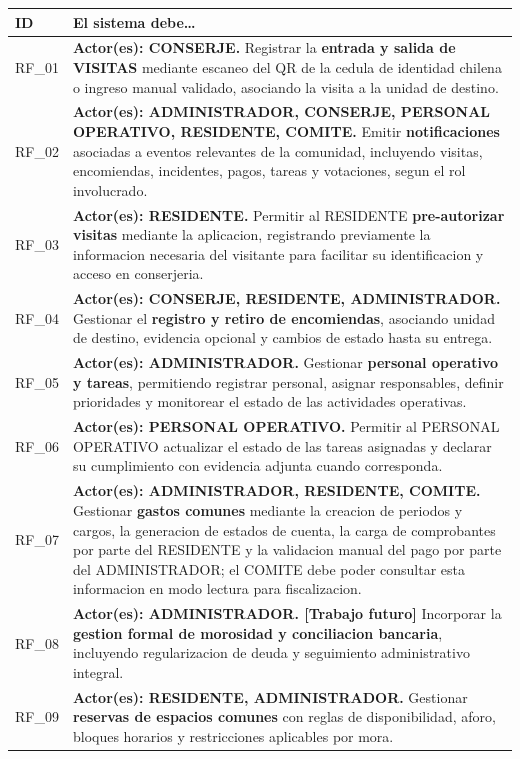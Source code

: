 {\small\setlength{\tabcolsep}{4pt}\renewcommand{\arraystretch}{1.2}
\begin{longtable}{|p{}|p{}|}
\hline
\textbf{ID} & \textbf{El sistema debe…} \\ \hline
RF\_01 & \textbf{Actor(es): CONSERJE.} Registrar la \textbf{entrada y salida de VISITAS} mediante escaneo del QR de la cedula de identidad chilena o ingreso manual validado, asociando la visita a la unidad de destino. \\ \hline
RF\_02 & \textbf{Actor(es): ADMINISTRADOR, CONSERJE, PERSONAL OPERATIVO, RESIDENTE, COMITE.} Emitir \textbf{notificaciones} asociadas a eventos relevantes de la comunidad, incluyendo visitas, encomiendas, incidentes, pagos, tareas y votaciones, segun el rol involucrado. \\ \hline
RF\_03 & \textbf{Actor(es): RESIDENTE.} Permitir al RESIDENTE \textbf{pre-autorizar visitas} mediante la aplicacion, registrando previamente la informacion necesaria del visitante para facilitar su identificacion y acceso en conserjeria. \\ \hline
RF\_04 & \textbf{Actor(es): CONSERJE, RESIDENTE, ADMINISTRADOR.} Gestionar el \textbf{registro y retiro de encomiendas}, asociando unidad de destino, evidencia opcional y cambios de estado hasta su entrega. \\ \hline
RF\_05 & \textbf{Actor(es): ADMINISTRADOR.} Gestionar \textbf{personal operativo y tareas}, permitiendo registrar personal, asignar responsables, definir prioridades y monitorear el estado de las actividades operativas. \\ \hline
RF\_06 & \textbf{Actor(es): PERSONAL OPERATIVO.} Permitir al PERSONAL OPERATIVO actualizar el estado de las tareas asignadas y declarar su cumplimiento con evidencia adjunta cuando corresponda. \\ \hline
RF\_07 & \textbf{Actor(es): ADMINISTRADOR, RESIDENTE, COMITE.} Gestionar \textbf{gastos comunes} mediante la creacion de periodos y cargos, la generacion de estados de cuenta, la carga de comprobantes por parte del RESIDENTE y la validacion manual del pago por parte del ADMINISTRADOR; el COMITE debe poder consultar esta informacion en modo lectura para fiscalizacion. \\ \hline
RF\_08 & \textbf{Actor(es): ADMINISTRADOR. [Trabajo futuro]} Incorporar la \textbf{gestion formal de morosidad y conciliacion bancaria}, incluyendo regularizacion de deuda y seguimiento administrativo integral. \\ \hline
RF\_09 & \textbf{Actor(es): RESIDENTE, ADMINISTRADOR.} Gestionar \textbf{reservas de espacios comunes} con reglas de disponibilidad, aforo, bloques horarios y restricciones aplicables por mora. \\ \hline

\end{longtable}}
